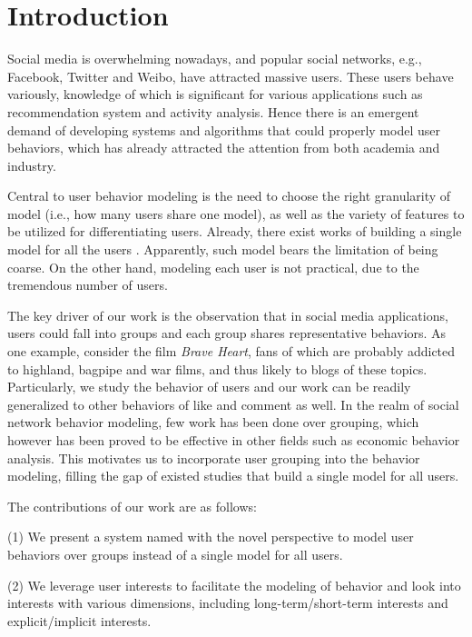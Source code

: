 \section{Introduction}
\label{sec:intro}

\par Social media is overwhelming nowadays, and popular social networks, e.g., Facebook, Twitter and Weibo, have attracted  massive users.
These users behave variously, knowledge of which is significant for various applications such as recommendation system and activity analysis.
Hence there is an emergent demand of developing systems and algorithms that could properly model user behaviors, which has already attracted the attention from both academia and industry.

Central to user behavior modeling is the need to choose the right granularity of model (i.e., how many users share one model), as well as the variety of features to be utilized for differentiating users.
Already, there exist works of building a single model for all the users \cite{IEEEexample:conf/wsdm/FengW13,IEEEexample:conf/ijcai/ZhangLTCL13}.
Apparently, such model bears the limitation of being coarse.
On the other hand, modeling each user is not practical, due to the tremendous number of users.

The key driver of our work is the observation that in social media applications, users could fall into groups and each group shares representative behaviors.
%
As one example, consider the film \textit{Brave Heart}, fans of which are probably addicted to highland, bagpipe and war films, and thus likely to \ret{} blogs of these topics.
Particularly, we study the \retg{} behavior of users and our work can be readily generalized to other behaviors of like and comment as well.
In the realm of social network behavior modeling, few work has been done over grouping, which however has been proved to be effective in other fields such as economic behavior analysis.
This motivates us to incorporate user grouping into the \retg{} behavior modeling, filling the gap of existed studies that build a single model for all users.

The contributions of our work are as follows:

\stab(1) We present a system named \sys{} with the novel perspective to model user behaviors over groups instead of a single model for all users.

\stab(2) We leverage user interests to facilitate the modeling of \retg{} behavior and look into interests with various dimensions, including long-term/short-term interests and explicit/implicit interests.


